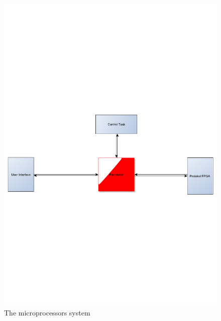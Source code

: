 \begin{figure}[htb]
	\centering
	\includegraphics[scale=0.5,clip,trim=0 300 0 300]{graphics/microprocessor} %
	\caption{The microprocessors system}
	\label{fig:microprocessor}			%
\end{figure}


